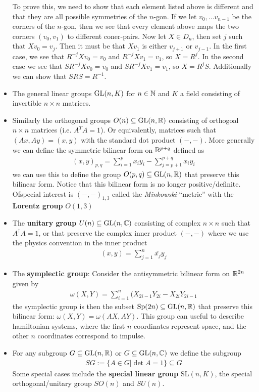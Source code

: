 \begin{ex}[]
\begin{itemize}
    To prove this, we need to show that each element listed above is different and that they are all possible symmetries of the $n$-gon.
    If we let $v_0, \ldots v_{n-1}$ be the corners of the $n$-gon, then we see that every element above maps the two corners $(v_0,v_1)$ to different coner-pairs.
    Now let $X \in D_n$, then set $j$ such that $X v_0 = v_j$. Then it must be that $Xv_1$ is either $v_{j+1}$ or $v_{j-1}$.
    In the first case, we see that $R^{-j}Xv_0 = v_0$ and $R^{-j}Xv_1 = v_1$, so $X = R^{j}$.
    In the second case we see that $SR^{-j}Xv_0 = v_0$ and $SR^{-j}Xv_1 = v_1$, so $X = R^{j}S$.
    Additionally we can show that $SRS = R^{-1}$.
  \item The general linear groups $\operatorname{GL}(n,K)$ for $n \in \mathbb{N}$ and $K$ a field consisting of invertible $n \times n$ matrices.
  \item Similarly the orthogonal groups $O(n) \subseteq \operatorname{GL}(n,\mathbb{R})$ consisting of orthogoal $n \times n$ matrices (i.e. $A^{T}A = 1$). Or equivalently, matrices such that $(Ax,Ay) = (x,y)$ with the standard dot product $(-,-)$.
    More generally we can define the symmetric bilinear form on $\mathbb{R}^{p+q}$ defined as
    \begin{align*}
      (x,y)_{p,q} = \sum_{i=1}^{p}x_iy_i - \sum_{j=p+1}^{p+q}x_i y_i
    \end{align*}
    we can use this to define the group $O(p,q) \subseteq \operatorname{GL}(n,\mathbb{R})$ that preserve this bilinear form.
    Notice that this bilinear form is no longer positive/definite. Ofspecial interest is $(-,-)_{1,3}$ called the \emph{Minkowski}-``metric'' with the \textbf{Lorentz group} $O(1,3)$
  \item The \textbf{unitary group} $U(n) \subseteq \operatorname{GL}(n,\mathbb{C})$ consisting of complex $n \times n$ such that $A^{\dagger}A = 1$, or that preserve the complex inner product $(-,-)$
    where we use the physics convention in the inner product
    \begin{align*}
      (x,y) = \sum_{j=1}^{n} \overline{x_j}y_j
    \end{align*}
  \item The \textbf{symplectic group}: Consider the antisymmetric bilinear form on $\mathbb{R}^{2n}$ given by
    \begin{align*}
      \omega(X,Y) = \sum_{i=1}^{n} (X_{2i - 1}Y_{2i} - X_{2i} Y_{2i-1}
    \end{align*}
    the symplectic group is then the subset $\text{Sp}(2n) \subseteq \operatorname{GL}(n,\mathbb{R})$ that preserve this bilinear form: $\omega(X,Y) = \omega(AX,AY)$.
    This group can useful to describe hamiltonian systems, where the first $n$ coordinates represent space, and the other $n$ coordinates correspond to impulse.
  \item For any subgroup $G \subseteq \operatorname{GL}(n,\mathbb{R})$ or $G \subseteq \operatorname{GL}(n,\mathbb{C})$ we define the subgroup
    \begin{align*}
      SG := \{A \in G \big\vert \det A = 1\} \subseteq G
    \end{align*}
    Some special cases include the \textbf{special linear group} $\text{SL}(n,K)$, the special orthogonal/unitary group $SO(n)$ and $SU(n)$.
\end{itemize}
\end{ex}

  

